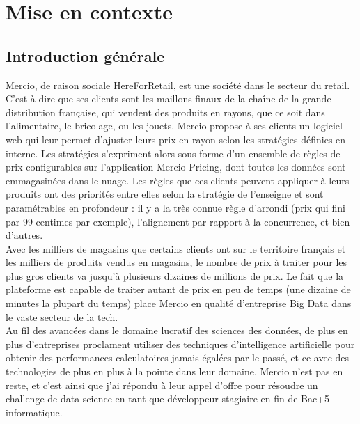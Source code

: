 \documentclass{rapportCS}
\begin{document}



\section{Mise en contexte} 

\subsection{Introduction générale}
	Mercio, de raison sociale HereForRetail, est une société dans le secteur du retail. 
	C'est à dire que ses clients sont les maillons finaux de la chaîne de la grande distribution 
	française, qui vendent des produits en rayons, que ce soit dans l'alimentaire, le bricolage, 
	ou les jouets. Mercio propose à ses clients un logiciel web qui leur permet d'ajuster leurs prix 
	en rayon selon les stratégies définies en interne. Les stratégies s'expriment alors sous forme 
	d'un ensemble de règles de prix configurables sur l'application Mercio Pricing, dont toutes les 
	données sont emmagasinées dans le nuage. Les règles que ces clients peuvent appliquer à leurs 
	produits ont des priorités entre elles selon la stratégie de l'enseigne et sont paramétrables en 
	profondeur : il y a la très connue règle d'arrondi (prix qui fini par 99 centimes par exemple), 
	l'alignement par rapport à la concurrence, et bien d'autres. \\
	Avec les milliers de magasins que certains clients ont sur le territoire français et les milliers 
	de produits vendus en magasins, le nombre de prix à traiter pour les plus gros clients va jusqu'à 
	plusieurs dizaines de millions de prix. Le fait que la plateforme est capable de traiter autant de 
	prix en peu de temps (une dizaine de minutes la plupart du temps) place Mercio en qualité 
	d'entreprise Big Data dans le vaste secteur de la tech.\\
	Au fil des avancées dans le domaine lucratif des sciences des données, de plus en plus 
	d'entreprises proclament utiliser des techniques d'intelligence artificielle pour obtenir des 
	performances calculatoires jamais égalées par le passé, et ce avec des technologies de plus en plus
	à la pointe dans leur domaine. 
	Mercio n'est pas en reste, et c'est ainsi que j'ai répondu à leur appel
	d'offre pour résoudre un challenge de data science en tant que développeur stagiaire en fin de 
	Bac+5 informatique.\\
\end{document}
